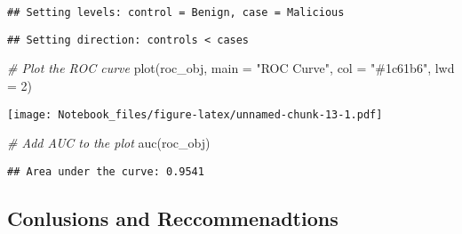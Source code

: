 \documentclass[
]{article}
\newenvironment{Shaded}{\begin{snugshade}}{\end{snugshade}}
\newcommand{\AttributeTok}[1]{\textcolor[rgb]{0.77,0.63,0.00}{#1}}
\newcommand{\CommentTok}[1]{\textcolor[rgb]{0.56,0.35,0.01}{\textit{#1}}}
\newcommand{\DecValTok}[1]{\textcolor[rgb]{0.00,0.00,0.81}{#1}}
\newcommand{\FunctionTok}[1]{\textcolor[rgb]{0.00,0.00,0.00}{#1}}
\newcommand{\NormalTok}[1]{#1}
\newcommand{\StringTok}[1]{\textcolor[rgb]{0.31,0.60,0.02}{#1}}
\begin{document}
\begin{verbatim}
## Setting levels: control = Benign, case = Malicious
\end{verbatim}

\begin{verbatim}
## Setting direction: controls < cases
\end{verbatim}

\begin{Shaded}
\begin{Highlighting}[]
\CommentTok{\# Plot the ROC curve}
\FunctionTok{plot}\NormalTok{(roc\_obj, }\AttributeTok{main =} \StringTok{"ROC Curve"}\NormalTok{, }\AttributeTok{col =} \StringTok{"\#1c61b6"}\NormalTok{, }\AttributeTok{lwd =} \DecValTok{2}\NormalTok{)}
\end{Highlighting}
\end{Shaded}

\texttt{[image: Notebook\_files/figure-latex/unnamed-chunk-13-1.pdf]}

\begin{Shaded}
\begin{Highlighting}[]
\CommentTok{\# Add AUC to the plot}
\FunctionTok{auc}\NormalTok{(roc\_obj)}
\end{Highlighting}
\end{Shaded}

\begin{verbatim}
## Area under the curve: 0.9541
\end{verbatim}

\hypertarget{conlusions-and-reccommenadtions}{%
\subsection{Conlusions and
Reccommenadtions}\label{conlusions-and-reccommenadtions}}
\end{document}
